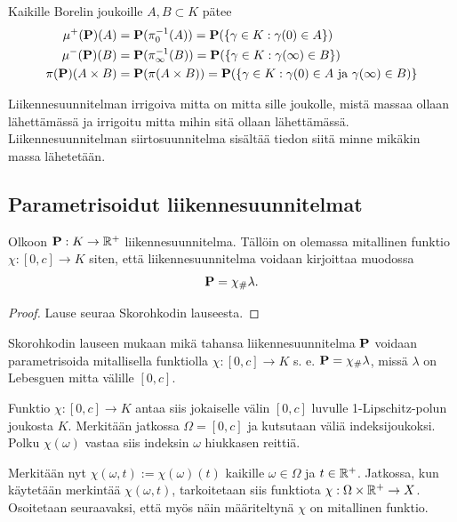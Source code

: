 \begin{remark}
    Kaikille Borelin joukoille $A, B \subset K$ pätee
    \begin{align*}
        \mu^+(\P)(A) &= \P(\pi_0^{-1}(A)) = \P(\{\gamma \in K : \gamma(0) \in A\}) \\
        \mu^-(\P)(B) &= \P(\pi_\infty^{-1}(B)) = \P(\{\gamma \in K : \gamma(\infty) \in B\}) \\
        \pi(\P)(A\times B) &= \P(\pi(A\times B)) = \P(\{\gamma \in K: \gamma(0) \in A\text{ ja } \gamma(\infty) \in B)\}
    \end{align*}
\end{remark}

Liikennesuunnitelman irrigoiva mitta on mitta sille joukolle, mistä massaa ollaan lähettämässä ja irrigoitu mitta mihin sitä ollaan lähettämässä. Liikennesuunnitelman siirtosuunnitelma sisältää tiedon siitä minne mikäkin massa lähetetään.

\subsection{Parametrisoidut liikennesuunnitelmat}
 
\begin{theorem}
    Olkoon $\P: K \to \R^+$ liikennesuunnitelma. Tällöin on olemassa mitallinen funktio $\chi: [0, c] \to K$ siten, että liikennesuunnitelma voidaan kirjoittaa muodossa $$\P =\chi_\# \lambda.$$
\end{theorem}
\begin{proof}
    Lause seuraa Skorohkodin lauseesta.
\end{proof}
Skorohkodin lauseen mukaan mikä tahansa liikennesuunnitelma $\P$ voidaan parametrisoida mitallisella funktiolla $ \chi: [0, c] \to K$ s. e. $\P = \chi_\# \lambda$, missä $\lambda$ on Lebesguen mitta välille $[0,c]$. 

Funktio $ \chi:[0, c] \to K$ antaa siis jokaiselle välin $[0, c]$ luvulle 1-Lipschitz-polun joukosta $K$. 
Merkitään jatkossa $\Omega = [0,c]$ ja kutsutaan väliä indeksijoukoksi. Polku $ \chi(\omega)$ vastaa siis indeksin $\omega$ hiukkasen reittiä.

Merkitään nyt $\chi(\omega, t) :=  \chi(\omega)(t)$ kaikille $\omega \in \Omega$ ja $t \in \R^+$. Jatkossa, kun käytetään merkintää $\chi(\omega, t)$, tarkoitetaan siis funktiota $\chi : \Omega \times \R^+ \to X$. Osoitetaan seuraavaksi, että myös näin määriteltynä $\chi$ on mitallinen funktio.


